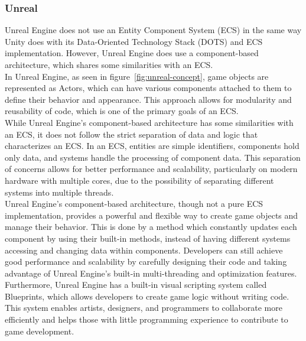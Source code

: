 \subsubsection{Unreal}\label{subsubsec:unreal:-component-based-architecture}
Unreal Engine does not use an Entity Component System (ECS) in the same way Unity does with its Data-Oriented Technology Stack (DOTS) and ECS implementation.
However, Unreal Engine does use a component-based architecture, which shares some similarities with an ECS.
\\
In Unreal Engine, as seen in figure~\ref{fig:unreal-concept}, game objects are represented as Actors, which can have
various components attached to them to define their behavior and appearance.
This approach allows for modularity and reusability of code, which is one of the primary goals of an ECS.
\\
While Unreal Engine's component-based architecture has some similarities with an ECS, it does not follow the strict separation of
data and logic that characterizes an ECS. In an ECS, entities are simple identifiers, components hold only data, and systems
handle the processing of component data.
This separation of concerns allows for better performance and scalability, particularly on modern hardware with multiple cores, due to the possibility
of separating different systems into multiple threads.
\\
Unreal Engine's component-based architecture, though not a pure ECS implementation, provides a powerful
and flexible way to create game objects and manage their behavior.
This is done by a method which constantly updates each component by using their built-in methods, instead of having different systems accessing and changing data within components.
Developers can still achieve good performance and scalability by carefully designing their code and taking
advantage of Unreal Engine's built-in multi-threading and optimization features.
\\
Furthermore, Unreal Engine has a built-in visual scripting system called Blueprints, which allows developers to create game logic without writing code.
This system enables artists, designers, and programmers to collaborate more efficiently and helps those with little programming experience to contribute
to game development.
